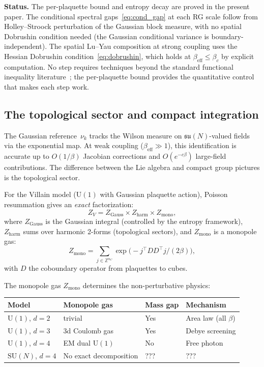 \documentclass[11pt]{article}
\theoremstyle{definition}
\newcommand{\su}{\mathfrak{su}}
\newcommand{\Z}{\mathbb{Z}}
\begin{document}
\medskip
\textbf{Status.}
The per-plaquette bound and entropy decay are proved in the 
present paper.  The conditional spectral gaps~\eqref{eq:cond_gap} 
at each RG scale follow from Holley--Stroock perturbation of the 
Gaussian block measure, with no spatial Dobrushin condition needed 
(the Gaussian conditional variance is boundary-independent).  
The spatial Lu--Yau composition at strong coupling uses the 
Hessian Dobrushin condition~\eqref{eq:dobrushin}, which holds 
at $\beta_{\mathrm{eff}} \leq \beta_c$ by explicit computation.  
No step requires techniques beyond the standard functional 
inequality literature~\cite{BGL,lu_yau,martinelli_olivieri}; 
the per-plaquette bound provides the quantitative control that 
makes each step work.

\subsection{The topological sector and compact integration}\label{sec:topology}

The Gaussian reference~$\nu_k$ tracks the Wilson measure on 
$\su(N)$-valued fields via the exponential map.  At weak coupling 
($\beta_{\mathrm{eff}} \gg 1$), this identification is accurate up to 
$O(1/\beta)$ Jacobian corrections and $O(e^{-c\beta})$ large-field 
contributions.  The difference between the Lie algebra and compact group 
pictures is the topological sector.

For the Villain model ($\mathrm{U}(1)$ with Gaussian plaquette action), 
Poisson resummation gives an \emph{exact} factorization:
\[
  Z_V = Z_{\mathrm{Gauss}} \times Z_{\mathrm{harm}} \times Z_{\mathrm{mono}},
\]
where $Z_{\mathrm{Gauss}}$ is the Gaussian integral (controlled by the 
entropy framework), $Z_{\mathrm{harm}}$ sums over harmonic 2-forms 
(topological sectors), and $Z_{\mathrm{mono}}$ is a monopole gas:
\[
  Z_{\mathrm{mono}} = \sum_{j \in \Z^{n_C}} \exp\bigl(-j^\top DD^\top j/(2\beta)\bigr),
\]
with $D$ the coboundary operator from plaquettes to cubes.

The monopole gas $Z_{\mathrm{mono}}$ determines the non-perturbative physics:

\begin{center}
\begin{tabular}{llll}
\toprule
\textbf{Model} & \textbf{Monopole gas} & \textbf{Mass gap} & \textbf{Mechanism} \\
\midrule
$\mathrm{U}(1)$, $d=2$ & trivial & Yes & Area law (all $\beta$) \\
$\mathrm{U}(1)$, $d=3$ & 3d Coulomb gas & Yes & Debye screening \\
$\mathrm{U}(1)$, $d=4$ & EM dual $\mathrm{U}(1)$ & No & Free photon \\
$\mathrm{SU}(N)$, $d=4$ & No exact decomposition & ??? & ??? \\
\bottomrule
\end{tabular}
\end{center}
\end{document}
